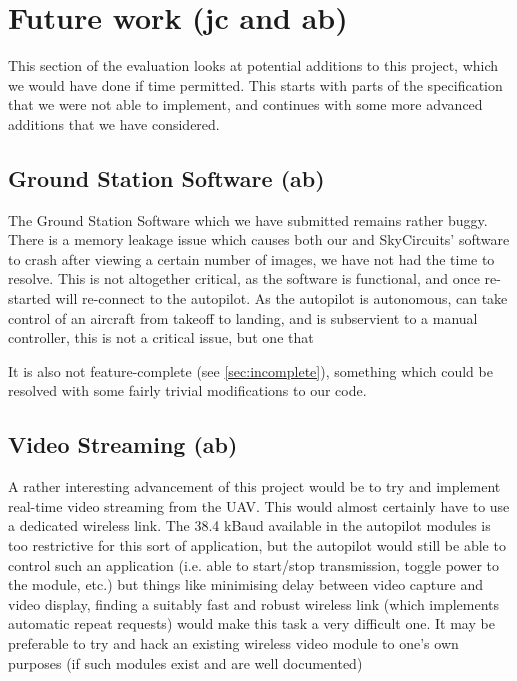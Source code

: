 
\section{Future work (jc and ab)}

This section of the evaluation looks at potential additions to this project, 
which we would have done if time permitted. This starts with parts of the 
specification that we were not able to implement, and continues with some 
more advanced additions that we have considered.

\subsection{Ground Station Software (ab)}

The Ground Station Software which we have submitted remains rather buggy. 
There is a memory leakage issue which causes both our and SkyCircuits' 
software to crash after viewing a certain number of images, we have not had the time to resolve. This is not altogether critical, as the software 
is functional, and once re-started will re-connect to the autopilot. 
As the autopilot is autonomous, can take control of an aircraft from takeoff 
to landing, and is subservient to a manual controller, this is not a critical 
issue, but one that 

It is also not feature-complete (see \ref{sec:incomplete}), something which 
could be resolved with some fairly trivial modifications to our code.



\subsection{Video Streaming (ab)}

A rather interesting advancement of this project would be to try and implement 
real-time video streaming from the UAV. This would almost certainly have to use 
a dedicated wireless link. The 38.4 kBaud available in the autopilot modules 
is too restrictive for this sort of application, but the autopilot would still 
be able to control such an application (i.e. able to start/stop transmission, 
toggle power to the module, etc.) but things like 
minimising delay between video capture and video 
display, finding a suitably fast and robust wireless link (which implements 
automatic repeat requests) would make this task a very difficult one. It may 
be preferable to try and hack an existing wireless video module to one's own purposes (if such modules exist and are 
well documented)


